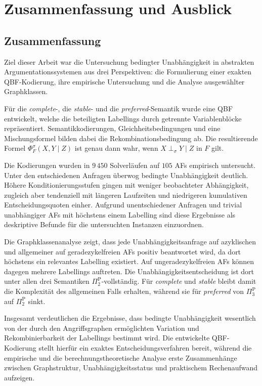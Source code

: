 \chapter{Zusammenfassung und Ausblick}
\label{ch:summary}

\section{Zusammenfassung}

Ziel dieser Arbeit war die Untersuchung bedingter Unabhängigkeit in
abstrakten Argumentationssystemen aus drei Perspektiven: die
Formulierung einer exakten QBF-Kodierung, ihre empirische Untersuchung
und die Analyse ausgewählter Graphklassen.

Für die \emph{complete}-, die \emph{stable}- und die
\emph{preferred}-Semantik wurde eine QBF entwickelt, welche die
beteiligten Labellings durch getrennte Variablenblöcke repräsentiert.
Semantikkodierungen, Gleichheitsbedingungen und eine Mischungsformel
bilden dabei die Rekombinationsbedingung ab. Die resultierende Formel
\(\Phi_F^\sigma(X,Y\mid Z)\) ist genau dann wahr, wenn
\(X\perp_\sigma Y\mid Z\) in \(F\) gilt.

Die Kodierungen wurden in \(9\,450\) Solverläufen auf \(105\) AFs
empirisch untersucht. Unter den entschiedenen Anfragen überwog
bedingte Unabhängigkeit deutlich. Höhere Konditionierungsstufen gingen
mit weniger beobachteter Abhängigkeit, zugleich aber tendenziell mit
    längeren Laufzeiten und niedrigeren kumulativen Entscheidungsquoten einher. Aufgrund
unentschiedener Anfragen und trivial unabhängiger AFs mit höchstens
einem Labelling sind diese Ergebnisse als deskriptive Befunde für die
untersuchten Instanzen einzuordnen.

Die Graphklassenanalyse zeigt, dass jede Unabhängigkeitsanfrage auf
azyklischen und allgemeiner auf geradezykelfreien AFs positiv
beantwortet wird, da dort höchstens ein relevantes Labelling existiert.
Auf ungeradezykelfreien AFs können dagegen mehrere Labellings auftreten.
Die Unabhängigkeitsentscheidung ist dort unter allen drei Semantiken
\(\Pi_2^{\mathrm{P}}\)-vollständig. Für \emph{complete} und
\emph{stable} bleibt damit die Komplexität des allgemeinen Falls
erhalten, während sie für \emph{preferred} von
\(\Pi_3^{\mathrm{P}}\) auf \(\Pi_2^{\mathrm{P}}\) sinkt.

Insgesamt verdeutlichen die Ergebnisse, dass bedingte Unabhängigkeit
wesentlich von der durch den Angriffsgraphen ermöglichten Variation und
Rekombinierbarkeit der Labellings bestimmt wird. Die entwickelte
QBF-Kodierung stellt hierfür ein exaktes Entscheidungsverfahren bereit,
während die empirische und die berechnungstheoretische Analyse erste
Zusammenhänge zwischen Graphstruktur, Unabhängigkeitsstatus und
praktischem Rechenaufwand aufzeigen.

